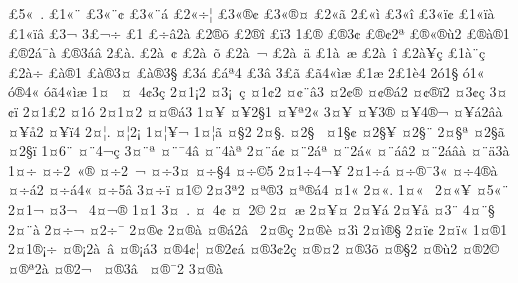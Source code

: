 {^^a35^^ab^^a0.
^^a31^^ab^^a8
^^a33^^ab^^a8^^a2
^^a33^^ab^^a8^^e1
^^a32^^ab^^f7^^a6
^^a33^^ab^^ae^^a2
^^a33^^ab^^ae^^a4
^^a32^^ab^^e3
2^^a3^^ab^^ec
^^a33^^ab^^ee
^^a33^^ab^^ef^^a2
^^a31^^ab^^ef^^e0
^^a31^^ab^^ef^^e2
^^a33^^ac
3^^a3^^ac^^f7
^^a31^^ad
^^a3^^ad^^f7^^e22^^e0
^^a32^^ad^^ae^^f5
^^a32^^ad^^ae^^ee
^^a3^^ad^^ef3
1^^a3^^ae
^^a3^^ae3^^a2
^^a3^^ae^^a22^^aa
^^a3^^ae^^ab^^ae^^f92
^^a3^^ae^^e0^^ae1
^^a3^^ae2^^e1^^af^^e0
^^a3^^ae3^^e1^^e2
2^^a3^^e0.
^^a32^^e0^^a0^^a2
^^a32^^e0^^a0^^f5
^^a32^^e0^^a0^^ac
^^a32^^e0^^a0^^e4
^^a31^^e0^^a0^^e6
^^a32^^e0^^a0^^ee
^^a32^^e0^^a5^^e7
^^a31^^e0^^a8^^e7
^^a32^^e0^^f7
^^a3^^e0^^ae1
^^a3^^e0^^ae3^^a4
^^a3^^e0^^ae3^^a7
^^a33^^e1
^^a3^^e1^^aa4
^^a33^^e2
3^^a3^^e3
^^a3^^e34^^ab^^ec^^e6
^^a31^^e6
2^^a31^^e84
2^^f31^^a7
^^f31^^ab
^^f3^^ae4^^ab
^^f3^^e34^^ab^^ec^^e6
1^^a4^^a0
^^a4^^a04^^a23^^e7
2^^a41^^a12
^^a43^^a1^^a0^^e7
^^a41^^a22
^^a4^^a2^^a8^^e23
^^a42^^a2^^ae
^^a4^^a2^^ae^^e12
^^a4^^a2^^ae^^ef2
^^a43^^a2^^e7
3^^a4^^a2^^ef
2^^a41^^a32
^^a41^^f3
2^^a41^^a42
^^a4^^a4^^ae^^e13
1^^a4^^a5
^^a4^^a52^^a71
^^a4^^a5^^aa2^^ab
3^^a4^^a5^^ad
^^a4^^a53^^ae
^^a4^^a54^^ae^^ac
^^a4^^a5^^e12^^e2^^e0
^^a4^^a5^^e52
^^a4^^a5^^ef4
2^^a4^^a6.
^^a4^^a62^^a1
1^^a4^^a6^^a5^^ac
1^^a4^^a6^^e3
^^a4^^a72
2^^a4^^a7.
^^a42^^a7^^a0
^^a41^^a7^^a2
^^a42^^a7^^a5
^^a42^^a7^^a8
2^^a4^^a7^^aa
^^a42^^a7^^e3
^^a42^^a7^^ef
1^^a46^^a8
^^a4^^a84^^ac^^e7
3^^a4^^a8^^ad^^aa
^^a4^^a8^^af4^^e2
^^a4^^a84^^e0^^aa
2^^a4^^a8^^e1^^a2
^^a4^^a82^^e1^^aa
^^a4^^a82^^e1^^ab
^^a4^^a8^^e1^^e22
^^a4^^a82^^e1^^e2^^e0
^^a4^^a8^^e43^^e0
1^^a4^^f7
^^a4^^f72^^a0^^ab^^ae
^^a4^^f72^^a0^^ac
^^a4^^f73^^a4
^^a4^^f7^^a74
^^a4^^f7^^a95
2^^a41^^f74^^ac^^a5
2^^a41^^f7^^ad^^e1
^^a4^^f7^^ae^^af3^^ab
^^a4^^f74^^ae^^e0
^^a4^^f7^^e12
^^a4^^f7^^e14^^ab
^^a4^^f75^^e2
3^^a4^^f7^^ef
^^a41^^a9
2^^a43^^aa2
^^a4^^aa^^ae3
^^a4^^aa^^ae^^e14
^^a41^^ab
2^^a4^^ab.
1^^a4^^ab^^a0
2^^a4^^ab^^a5
^^a45^^ab^^a8
2^^a41^^ac
^^a43^^ac^^a0
4^^a4^^ac^^ae
1^^a41^^ad
3^^a4^^ad^^a0.
^^a4^^ad^^a04^^a2
^^a4^^ad^^a02^^a9
2^^a4^^ad^^a0^^e6
2^^a4^^ad^^a5^^a4
2^^a4^^ad^^a5^^e1
2^^a4^^ad^^a5^^e5
^^a43^^ad^^a8
4^^a4^^ad^^a8^^a7
2^^a4^^ad^^a8^^e0
2^^a4^^ad^^f7^^ac
^^a42^^ad^^f7^^af
2^^a4^^ad^^ae^^a2
2^^a4^^ad^^ae^^e0
^^a4^^ad^^ae^^e12^^e2^^a0
2^^a4^^ad^^ae^^e7
2^^a4^^ad^^ae^^e8
^^a43^^ad^^ec
2^^a4^^ad^^ec^^ae^^a7
2^^a4^^ad^^ef^^a2
2^^a4^^ad^^ef^^ab
1^^a4^^ae1
2^^a41^^ae^^a1^^f7
^^a4^^ae^^a12^^e0^^a0^^e2
^^a4^^ae^^a1^^e13
^^a4^^ae4^^a2^^a6
^^a4^^ae2^^a2^^e1
^^a4^^ae3^^a22^^e7
^^a4^^ae^^a42
^^a4^^ae3^^f5
^^a4^^ae^^a72
^^a4^^ae^^f92
^^a4^^ae2^^a9
^^a4^^ae^^aa2^^e0
^^a4^^ae2^^ac^^ad^^a0
^^a4^^ae3^^ad^^e2^^a0
^^a4^^ae^^af2
3^^a4^^ae^^e0
}
